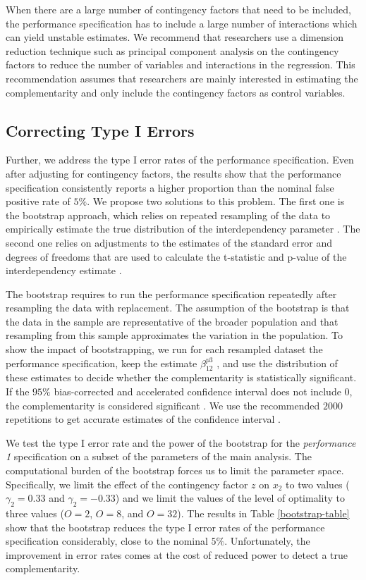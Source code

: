 \documentclass[12pt]{article}
\begin{document}
When there are a large number of contingency factors that need to be included, the performance specification has to include a large number of interactions which can yield unstable estimates. We recommend that researchers use a dimension reduction technique such as principal component analysis on the contingency factors to reduce the number of variables and interactions in the regression. This recommendation assumes that researchers are mainly interested in estimating the complementarity and only include the contingency factors as control variables.

\subsection{Correcting Type I Errors}

Further, we address the type I error rates of the performance specification. Even after adjusting for contingency factors, the results show that the performance specification consistently reports a higher proportion than the nominal false positive rate of $5\%$. We propose two solutions to this problem. The first one is the bootstrap approach, which relies on repeated resampling of the data to empirically estimate the true distribution of the interdependency parameter \citep{efron_computer_2017}. The second one relies on adjustments to the estimates of the standard error and degrees of freedoms that are used to calculate the t-statistic and p-value of the interdependency estimate \citep{young_improved_2016}.

The bootstrap requires to run the performance specification repeatedly after resampling the data with replacement. The assumption of the bootstrap is that the data in the sample are representative of the broader population and that resampling from this sample approximates the variation in the population. To show the impact of bootstrapping, we run for each resampled dataset the performance specification, keep the estimate $\beta_{12}^{p3}$ , and use the distribution of these estimates to decide whether the complementarity is statistically significant. If the $95\%$ bias-corrected and accelerated confidence interval does not include $0$, the complementarity is considered significant \citep{efron_computer_2017}. We use the recommended $2000$ repetitions to get accurate estimates of the confidence interval \citep{efron_computer_2017}. 

We test the type I error rate and the power of the bootstrap for the \emph{performance 1} specification on a subset of the parameters of the main analysis. The computational burden of the bootstrap forces us to limit the parameter space. Specifically, we limit the effect of the contingency factor $z$ on $x_2$ to two values ($\gamma_2 = 0.33$ and $\gamma_2 = -0.33$) and we limit the values of the level of optimality to three values ($O=2$, $O=8$, and $O=32$). The results in Table \ref{bootstrap-table} show that the bootstrap reduces the type I error rates of the performance specification considerably, close to the nominal $5\%$.  Unfortunately, the improvement in error rates comes at the cost of reduced power to detect a true complementarity.
\end{document}
